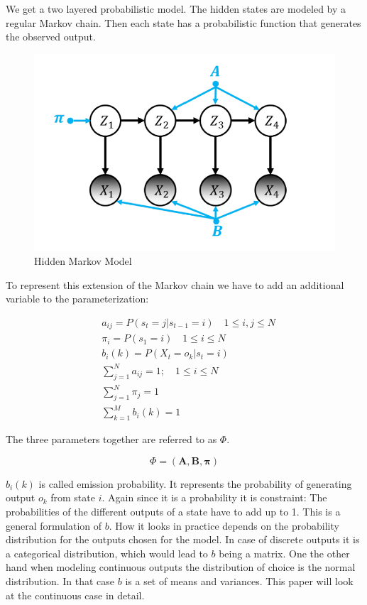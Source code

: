 We get a two layered probabilistic model. The hidden states are modeled by a regular Markov chain. Then each state has a probabilistic function that generates the observed output. 

\begin{figure}
    \centering
   \includegraphics{figures/HMM.png}
\caption{Hidden Markov Model}    
\label{fig:hmm}
\end{figure}


To represent this extension of the Markov chain we have to add an additional variable to the parameterization: 

\begin{equation}
\begin{aligned}
&a_{i j}=P\left(s_{t}=j | s_{t-1}=i\right) \quad 1 \leq i, j \leq N \\
&\pi_{i}=P\left(s_{1}=i\right) \quad 1 \leq i \leq N \\
&b_{i}(k)=P\left(X_{t}=o_{k} | s_{t}=i\right) \\
&\sum_{j=1}^{N} a_{i j}=1 ; \quad 1 \leq i \leq N \\
&\sum_{j=1}^{N} \pi_{j}=1 \\
&\sum_{k=1}^{M} b_{i}(k)=1
\end{aligned}
\label{eq:hmm-def}
\end{equation}

The three parameters together are referred to as $\Phi$.

\begin{equation}
\Phi=(\mathbf{A}, \mathbf{B}, \boldsymbol{\pi})
\end{equation}

$b_{i}(k)$ is called emission probability. It represents the probability of generating output $o_k$ from state $i$. Again since it is a probability it is constraint: The probabilities of the different outputs of a state have to add up to 1. This is a general formulation of $b$. How it looks in practice depends on the probability distribution for the outputs chosen for the model. In case of discrete outputs it is a categorical distribution, which would lead to $b$ being a matrix. One the other hand when modeling continuous outputs the distribution of choice is the normal distribution. In that case $b$ is a set of means and variances. This paper will look at the continuous case in detail. 

